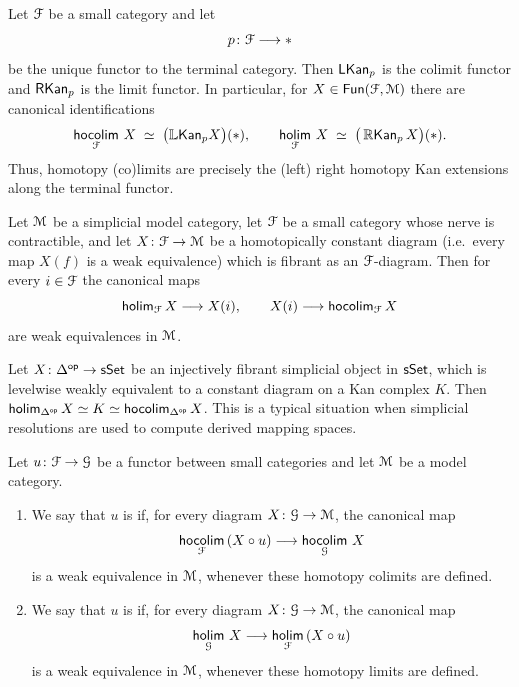 \begin{remark}\label{ch2:: rem: holim-hocolim-as-kan}
  Let $\mathcal F$ be a small category and let
  \begin{equation}
    p \colon \mathcal F \longrightarrow *
  \end{equation}
  be the unique functor to the terminal category.
  Then $\operatorname{{\sf LKan}}_p$ is the colimit functor and $\operatorname{{\sf RKan}}_{p}$ is the limit functor.
  In particular, for $X\in\operatorname{{\sf Fun}}(\mathcal F,\mathcal M)$ there are canonical identifications
  \begin{equation}
    \hoColimit[\cF] X
    \;\simeq\;
    \big(\LL\mathsf{Kan}_p X\big)(*),
    \qquad
    \hoLimit[\cF] X
    \;\simeq\;
    \big(\Rrkan_{p} X\big)(*).
  \end{equation}
  Thus, homotopy (co)limits are precisely the (left) right homotopy Kan extensions along the terminal functor.
\end{remark}


\begin{proposition}\label{ch2:: prop: homotopy-limit-homotopically-constant}
  Let $\mathcal M$ be a simplicial model category, let $\mathcal F$ be a small category
  whose nerve is contractible, and let
  $X \colon \mathcal F \to \mathcal M$ be a homotopically constant diagram (i.e.~every map
  $X(f)$ is a weak equivalence) which is fibrant as an $\mathcal F$-diagram.  Then
  for every $i \in \mathcal F$ the canonical maps
  \[
    \operatorname{\sf holim}_{\mathcal F} X \longrightarrow X(i),
    \qquad
    X(i) \longrightarrow \operatorname{\sf hocolim}_{\mathcal F} X
  \]
  are weak equivalences in $\mathcal M$.
\end{proposition}

\begin{example}
  Let $X \colon \Delta^{\mathsf{op}} \to \operatorname{\sf sSet}$ be an injectively fibrant simplicial object in $\operatorname{\sf sSet}$, which is levelwise weakly equivalent to a constant diagram on a
  Kan complex $K$.  Then
  $\operatorname{\sf holim}_{\Delta^{\mathsf{op}}} X \simeq K \simeq \operatorname{\sf hocolim}_{\Delta^{\mathsf{op}}} X$.  This
  is a typical situation when simplicial resolutions are used to compute
  derived mapping spaces.
\end{example}

\begin{definition}
  Let $u \colon \mathcal F \to \mathcal G$ be a functor between small categories and let
  $\mathcal M$ be a model category.

  \begin{enumerate}
    \item We say that $u$ is  if, for every diagram
      $X \colon \mathcal G \to \mathcal M$, the canonical map
      \[
        \hoColimit[\cF] (X \circ u)
        \longrightarrow
        \hoColimit[\cG] X
      \]
      is a weak equivalence in $\mathcal M$, whenever these homotopy colimits are
      defined.

    \item We say that $u$ is  if, for every diagram
      $X \colon \mathcal G \to \mathcal M$, the canonical map
      \[
        \hoLimit[\cG] X
        \longrightarrow
        \hoLimit[\cF] (X \circ u)
      \]
      is a weak equivalence in $\mathcal M$, whenever these homotopy limits are
      defined.
  \end{enumerate}
\end{definition}

